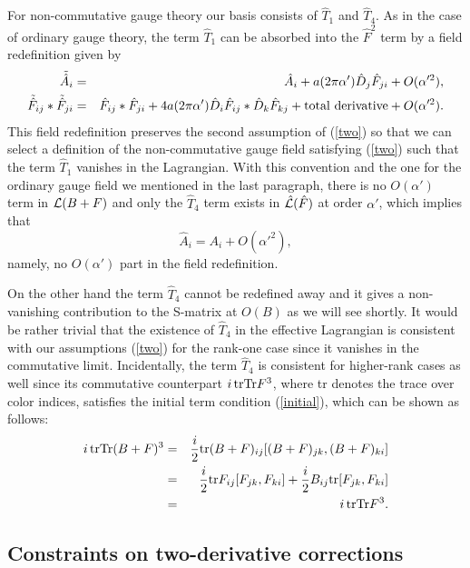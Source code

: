 \documentclass[a4paper,12pt]{article}
\begin{document}
For non-commutative gauge theory our basis consists of
$\hat{T}_1$ and $\hat{T}_4$.
As in the case of ordinary gauge theory,
the term $\hat{T}_1$ can be absorbed into the $\hat{F}^2$ term
by a field redefinition given by
\begin{eqnarray}
\tilde{\hat{A}}_i &=& \hat{A}_i
+ a (2 \pi \alpha') \hat{D}_j \hat{F}_{ji}
+ O(\alpha'^2), \\
\tilde{\hat{F}}_{ij} \ast \tilde{\hat{F}}_{ji}
&=& \hat{F}_{ij} \ast \hat{F}_{ji}
+ 4 a (2 \pi \alpha') \hat{D}_i \hat{F}_{ij}
\ast \hat{D}_k \hat{F}_{kj}
+ {\rm total~derivative} + O(\alpha'^2).
\end{eqnarray}
This field redefinition preserves
the second assumption of (\ref{two})
so that we can select a definition of the non-commutative gauge
field satisfying (\ref{two})
such that the term $\hat{T}_1$ vanishes
in the Lagrangian.
With this convention and the one
for the ordinary gauge field we mentioned in the last paragraph,
there is no $O(\alpha')$ term
in ${\cal L} (B+F)$ and only the $\hat{T}_4$ term exists
in $\hat{{\cal L}} (\hat{F})$ at order $\alpha'$,
which implies that
\begin{equation}
\hat{A}_i = A_i + O(\alpha'^2),
\label{no-alpha'}
\end{equation}
namely, no $O(\alpha')$ part in the field redefinition.

On the other hand the term $\hat{T}_4$ cannot be redefined away
and it gives a non-vanishing contribution to the S-matrix
at $O(B)$ as we will see shortly.
It would be rather trivial that the existence of $\hat{T}_4$
in the effective Lagrangian is consistent with our assumptions
(\ref{two}) for the rank-one case
since it vanishes in the commutative limit.
Incidentally, the term $\hat{T}_4$ is consistent
for higher-rank cases as well
since its commutative counterpart $i \, {\rm tr} {\rm Tr} F^3$,
where tr denotes the trace over color indices,
satisfies the initial term condition (\ref{initial}),
which can be shown as follows:
\begin{eqnarray}
i \, {\rm tr} {\rm Tr} (B+F)^3 &=&
\frac{i}{2} {\rm tr} (B+F)_{ij} [ (B+F)_{jk}, (B+F)_{ki} ]
\nonumber \\
&=& \frac{i}{2} {\rm tr} F_{ij} [ F_{jk}, F_{ki} ]
+ \frac{i}{2} B_{ij} {\rm tr} [ F_{jk}, F_{ki} ]
\nonumber \\
&=& i \, {\rm tr} {\rm Tr} F^3.
\end{eqnarray}

\subsection{Constraints on two-derivative corrections}
\indent
\end{document}
